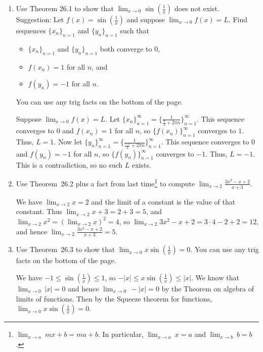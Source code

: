 \documentclass[12pt]{amsart}
\def\ds{\displaystyle}
\numberwithin{equation}{section}
\theoremstyle{plain} %
\theoremstyle{definition}
\theoremstyle{remark}
\begin{document}
\begin{enumerate} 

\item Use Theorem 26.1 to show that $\ds \lim_{x\to 0} \sin\left(\frac{1}{x}\right)$ does not exist.\\
Suggestion: Let $f(x)= \sin(\frac{1}{x})$ and suppose $\lim_{x\to 0} f(x) = L$. Find sequences $\{x_n\}_{n=1}$  and $\{y_n\}_{n=1}$ such that
\begin{itemize}
\item  $\{x_n\}_{n=1}$ and $\{y_n\}_{n=1}$ both converge to $0$,
\item $f(x_n)=1$ for all $n$, and
\item $f(y_n)=-1$ for all $n$.
\end{itemize}
You can use any trig facts on the bottom of the page.

\begin{framed}
Suppose $\lim_{x\to 0} f(x) = L$. Let $\{x_n\}_{n=1}^\infty = \{ \frac{1}{\frac{\pi}{2} + 2\pi n}\}_{n=1}^\infty$. This sequence converges to $0$ and $f(x_n)=1$ for all $n$, so $\{f(x_n)\}_{n=1}^\infty$ converges to $1$. Thus, $L=1$. Now let $\{y_n\}_{n=1}^\infty = \{ \frac{1}{\frac{-\pi}{2} + 2\pi n}\}_{n=1}^\infty$. This sequence converges to $0$ and $f(y_n)=-1$ for all $n$, so $\{f(y_n)\}_{n=1}^\infty$ converges to $-1$. Thus, $L=-1$. This is a contradiction, so no such $L$ exists.
\end{framed}

\item Use Theorem~26.2 plus a fact from last time\footnote{$\lim_{x\to a} \ mx+b = ma+b$. In particular, $\lim_{x\to a} \ x = a$ and $\lim_{x \to b} \ b = b$.}  to compute $\ds \lim_{x\to 2} \frac{3x^2 - x +2}{x+3}$.

\begin{framed}
We have $\lim_{x\to 2} x= 2$ and the limit of a constant is the value of that constant. Thus $\lim_{x\to 2} x+3 = 2+3 = 5$, and $\lim_{x\to 2} x^2 = (\lim_{x\to 2} x)^2 = 4$, so $\lim_{x\to 2} 3x^2 - x +2 = 3 \cdot 4 - 2 + 2 = 12$, and hence $\ds \lim_{x\to 2} \frac{3x^2 - x +2}{x+3}=5$.
\end{framed}

\item Use Theorem~26.3 to show that $\displaystyle \lim_{x\to 0} x \sin\left(\frac{1}{x}\right)=0$. You can use any trig facts on the bottom of the page.

\begin{framed}
We have $-1\leq  \sin\left(\frac{1}{x}\right) \leq 1$, so $-|x| \leq x \sin\left(\frac{1}{x}\right) \leq |x|$. We know that $\lim_{x\to 0} \, |x| = 0$ and hence $\lim_{x\to 0} \, -|x| = 0$ by the Theorem on algebra of limits of functions. Then by the Squeeze theorem for functions, $\displaystyle \lim_{x\to 0} x \sin\left(\frac{1}{x}\right)=0$.
\end{framed}



\end{enumerate}
\end{document}

